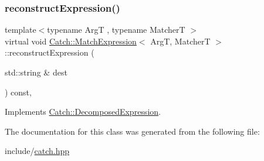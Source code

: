 \mbox{\label{class_catch_1_1_match_expression_a4410a93bc5b8241eb2502f400fce7ec4}} 
\subsubsection{\texorpdfstring{reconstruct\+Expression()}{reconstructExpression()}}
{\footnotesize\ttfamily template$<$typename ArgT , typename MatcherT $>$ \\
virtual void \mbox{\hyperlink{class_catch_1_1_match_expression}{Catch\+::\+Match\+Expression}}$<$ ArgT, MatcherT $>$\+::reconstruct\+Expression (\begin{DoxyParamCaption}\item[{std\+::string \&}]{dest }\end{DoxyParamCaption}) const\hspace{0.3cm}{\ttfamily [inline]}, {\ttfamily [virtual]}}



Implements \mbox{\hyperlink{struct_catch_1_1_decomposed_expression_a9ce7f356dc96f11f80e40c82f5aa7e55}{Catch\+::\+Decomposed\+Expression}}.



The documentation for this class was generated from the following file\+:\begin{DoxyCompactItemize}
\item 
include/\mbox{\hyperlink{catch_8hpp}{catch.\+hpp}}\end{DoxyCompactItemize}
